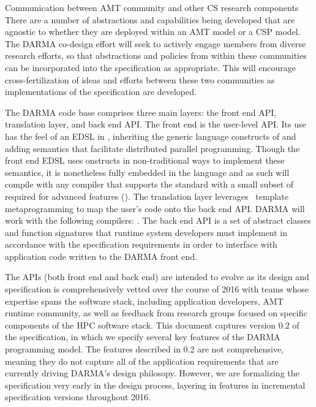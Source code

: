 \begin{compactdesc}
\item[Communication between AMT community and other CS research components]
There are a number of abstractions and capabilities being developed that are
agnostic to whether they are deployed within an \gls{AMT} model or a \gls{CSP} model.
The DARMA co-design effort will seek to actively engage members from diverse
research efforts, so that abstractions and policies from within these communities can be
incorporated into the specification as appropriate.
 This will encourage cross-fertilization of ideas and efforts between these two
 communities as implementations of the specification are developed.
\end{compactdesc}

The DARMA code base comprises three main layers: the \gls{front end} \gls{API},
\gls{translation layer}, and
\gls{back end} \gls{API}. 
The \gls{front end} is the user-level \gls{API}. 
Its use has the feel of an \gls{EDSL} in \CC,  inheriting the generic
language constructs of \CC and adding \gls{semantics} that facilitate
distributed parallel programming.  Though the \gls{front end} \gls{EDSL} uses
\CC onstructs in non-traditional ways to implement these semantics, it is
nonetheless fully embedded in the \CC language and as such will compile with any
\CC compiler that supports the  standard with a small subset of 
required for advanced features ().  
The \gls{translation layer} leverages \CC\ \gls{template
metaprogramming} to map the user's code onto the \gls{back end} \gls{API}.
DARMA will work with the following compilers: .
The \gls{back end} \gls{API} is a set of abstract classes and function
signatures that runtime system developers must implement in accordance with the
specification requirements in order to interface with application code written
to the DARMA front end.  

The \gls{API}s (both front end and back end) are intended to evolve as its
design and specification is comprehensively vetted over the course of 2016 with teams whose expertise spans the software stack,
including application
developers, \gls{AMT} runtime community, as well as feedback from
research groups focused on specific components of the \gls{HPC} software stack.
This document captures version 0.2 of the specification, in which we 
specify several key features of the DARMA programming model. The features
described in 0.2 are not comprehensive, meaning they do not capture all of the
application requirements that are currently driving DARMA's design philosopy. 
However, we are formalizing the specification very early in the
design process, layering in features in incremental specification versions
throughout 2016.

